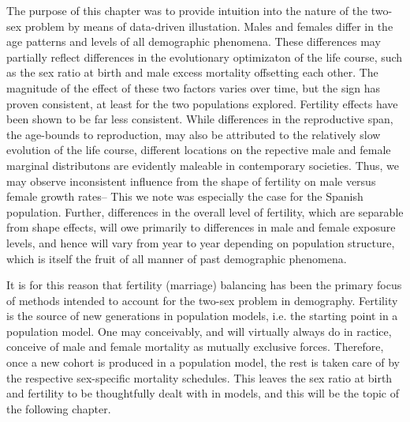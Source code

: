 \FloatBarrier

The purpose of this chapter was to provide intuition into the nature of the
two-sex problem by means of data-driven illustation. Males and females differ in
the age patterns and levels of all demographic phenomena. These differences
may partially reflect differences in the evolutionary optimizaton of the life
course, such as the sex ratio at birth and male excess mortality offsetting each
other. The magnitude of the effect of these two factors varies over time, but
the sign has proven consistent, at least for the two populations explored.
Fertility effects have been shown to be far less consistent. While differences
in the reproductive span, the age-bounds to reproduction, may also be attributed
to the relatively slow evolution of the life course, different locations on the
repective male and female marginal distributons are evidently maleable in
contemporary societies. Thus, we may observe inconsistent influence from the
shape of fertility on male versus female growth rates-- This we note was
especially the case for the Spanish population. Further, differences in the
overall level of fertility, which are separable from shape effects, will 
owe primarily to differences in male and female exposure levels, and hence will vary
from year to year depending on population structure, which is itself the fruit
of all manner of past demographic phenomena.

It is for this reason that fertility (marriage) balancing has been the primary
focus of methods intended to account for the two-sex problem in demography.
Fertility is the source of new generations in population models, i.e. the
starting point in a population model. One may conceivably, and will virtually
always do in ractice, conceive of male and female mortality as mutually
exclusive forces. Therefore, once a new cohort is produced in a population
model, the rest is taken care of by the respective sex-specific mortality
schedules. This leaves the sex ratio at birth and fertility to be
thoughtfully dealt with in models, and this will be the topic of the following
chapter.
